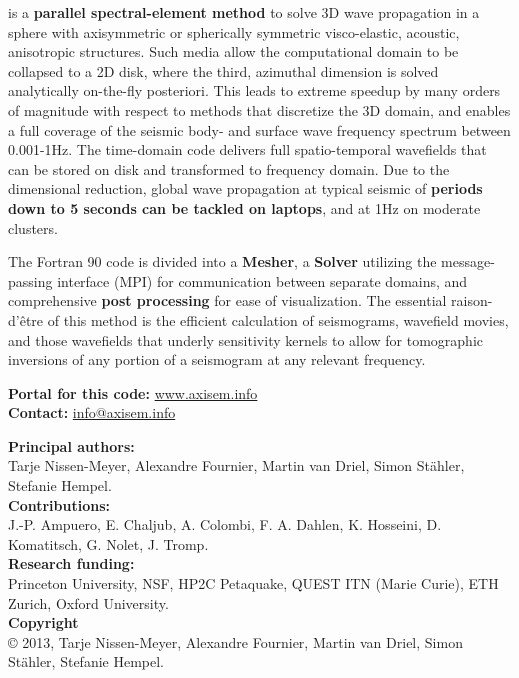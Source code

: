 \documentclass{article}
\begin{document}
%
%
 is a \textbf{parallel spectral-element method} to solve
3D wave propagation in a sphere with axisymmetric or spherically symmetric
visco-elastic, acoustic, anisotropic structures. Such media allow the
computational domain to be collapsed to a 2D disk, where the third, azimuthal
dimension is solved analytically on-the-fly posteriori. This leads to extreme
speedup by many orders of magnitude with respect to methods that discretize the
3D domain, and enables a full coverage of the seismic body- and surface wave
frequency spectrum between 0.001-1Hz.  The time-domain code delivers full
spatio-temporal wavefields that can be stored on disk and transformed to
frequency domain. Due to the dimensional reduction, global wave propagation at
typical seismic of \textbf{periods down to 5 seconds can be tackled on
laptops}, and at 1Hz on moderate clusters.

The Fortran 90 code is divided into a \textbf{Mesher}, a \textbf{Solver}
utilizing the message-passing interface (MPI) for communication between
separate domains, and comprehensive \textbf{post processing} for ease of
visualization.
The essential raison-d'\^{e}tre of this method is the efficient
calculation of seismograms, wavefield movies, and those wavefields that underly
sensitivity kernels to allow for tomographic inversions of any portion of a
seismogram at any relevant frequency. 

\begin{center}
\textbf{Portal for this code:} \href{http://www.axisem.info}{www.axisem.info}\\
\textbf{Contact:} \href{mailto:info@axisem.info}{info@axisem.info}
\end{center}

%
\noindent \textbf{Principal authors:} \\
Tarje Nissen-Meyer, Alexandre
Fournier, Martin van Driel, Simon St\"{a}hler, Stefanie Hempel.\vspace*{0.3cm}\\
\noindent \textbf{Contributions:}\\
 J.-P. Ampuero, E. Chaljub, A. Colombi, F. A. Dahlen, K. Hosseini, D. Komatitsch,
 G. Nolet, J. Tromp.\vspace*{0.3cm}\\
\noindent \textbf{Research funding:} \\Princeton University, NSF, HP2C Petaquake, 
QUEST ITN (Marie Curie), ETH Zurich, Oxford University.\vspace*{0.3cm}\\
%
\noindent \textbf{Copyright}\\
\copyright  \hspace*{0.1cm} 
2013, Tarje Nissen-Meyer,
Alexandre Fournier, Martin van Driel, Simon St\"{a}hler, Stefanie Hempel.\vspace*{0.3cm}\\
\end{document}
